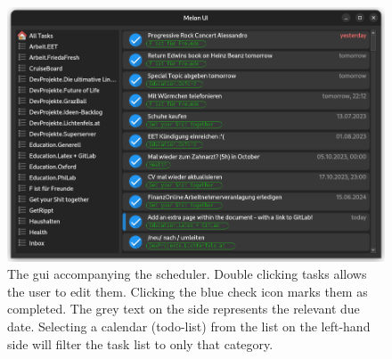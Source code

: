 \documentclass{prettytex/ox/mmsc-special-topic}
\title{\topictitle}
\author{Candidate \candidatenumber}
\date{\today}
\begin{document}
  \pagestyle{plain}
  \mmscSpecialHeader

  \begin{abstract}
    \label{abstract}
    In this project we will implement a task scheduling method on the basis of a \gls{mcmc} method with Simulated Annealing. The project is publicly available as a software package \textbf{melon-scheduler} on PyPi and entirely original.
    The package can download tasks from a  server, store and load them locally, synchronise with updates from the server and finally, schedule them into a calendar.
    It also comes with a , cf. .

    The key algorithm described in this report is the \gls{mcmc} scheduling procedure, taking a set of tasks as an input and returning an ordered set of time slots as output.
    The attached code contains four original implementations of the algorithm in three different languages: Python, Rust and C++.

    We will compare the performance of the four different implementations to see whether outsourcing performance-critical sections of code to low-level languages is worth the effort in the context of scientific computing.
  \end{abstract}

  \begin{figure}[H]
    \centering
    \includegraphics[width=0.85\linewidth]{figures/melon-ui.png}
    \caption{The \gls{gui} accompanying the scheduler. Double clicking tasks allows the user to edit them. Clicking the blue check icon marks them as completed. The grey text on the side represents the relevant due date. Selecting a calendar (todo-list) from the list on the left-hand side will filter the task list to only that category.}
    \label{fig:gui}
  \end{figure}
\end{document}
